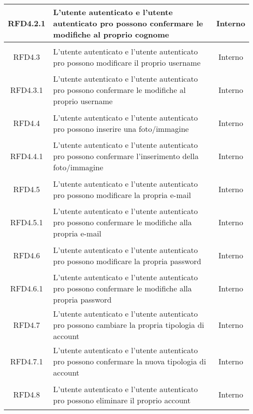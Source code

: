 \begin{longtable}{|c|>{\centering}m{7cm}|c|}
\hypertarget{RFD4.2.1}{RFD4.2.1} & L’utente autenticato e l’utente autenticato pro possono confermare le modifiche al proprio cognome & Interno
\\ \hline

\hypertarget{RFD4.3}{RFD4.3} & L’utente autenticato e l’utente autenticato pro possono modificare il proprio username & Interno
\\ \hline

\hypertarget{RFD4.3.1}{RFD4.3.1} &  L’utente autenticato e l’utente autenticato pro possono confermare le modifiche al proprio username & Interno
\\ \hline

\hypertarget{RFD4.4}{RFD4.4} & L’utente autenticato e l’utente autenticato pro possono inserire una foto/immagine  & Interno
\\ \hline

\hypertarget{RFD4.4.1}{RFD4.4.1} & L’utente autenticato e l’utente autenticato pro possono confermare l’inserimento della foto/immagine & Interno
\\ \hline

\hypertarget{RFD4.5}{RFD4.5} & L’utente autenticato e l’utente autenticato pro possono modificare la propria e-mail  & Interno
\\ \hline

\hypertarget{RFD4.5.1}{RFD4.5.1} & L’utente autenticato e l’utente autenticato pro possono confermare le modifiche alla propria e-mail  & Interno
\\ \hline

\hypertarget{RFD4.6}{RFD4.6} & L’utente autenticato e l’utente autenticato pro possono modificare la propria password & Interno
\\ \hline

\hypertarget{RFD4.6.1}{RFD4.6.1} & L’utente autenticato e l’utente autenticato pro possono confermare le modifiche alla propria password  & Interno
\\ \hline

\hypertarget{RFD4.7}{RFD4.7} & L’utente autenticato e l’utente autenticato pro possono cambiare la propria tipologia di account & Interno
\\ \hline

\hypertarget{RFD4.7.1}{RFD4.7.1} & L’utente autenticato e l’utente autenticato pro possono confermare la nuova tipologia di account  & Interno
\\ \hline

\hypertarget{RFD4.8}{RFD4.8} & L’utente autenticato e l’utente autenticato pro possono eliminare il proprio account  & Interno
\\ \hline


\end{longtable}
